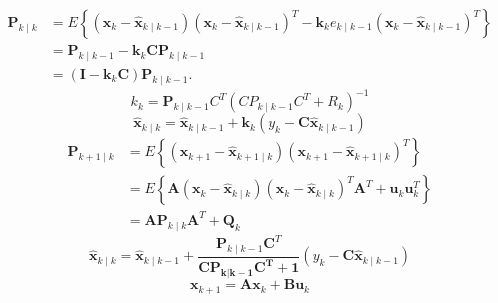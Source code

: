 \begin{equation}\label{eq:kalman_P_kk}
\begin{aligned}
\boldsymbol{P}_{k \mid k} &=E\left\{\left(\boldsymbol{x}_k-\hat{\boldsymbol{x}}_{k \mid k-1}\right)\left(\boldsymbol{x}_k-\hat{\boldsymbol{x}}_{k \mid k-1}\right)^T-\boldsymbol{k}_k e_{k \mid k-1}\left(\boldsymbol{x}_k-\hat{\boldsymbol{x}}_{k \mid k-1}\right)^T\right\} \\
&=\boldsymbol{P}_{k \mid k-1}-\boldsymbol{k}_k \boldsymbol{C} \boldsymbol{P}_{k \mid k-1} \\
&=\left(\boldsymbol{I}-\boldsymbol{k}_k \boldsymbol{C}\right) \boldsymbol{P}_{k \mid k-1} .
\end{aligned}
\end{equation}
\begin{equation}\label{eq:kalman_k_k}
k_k=\boldsymbol{P}_{k \mid k-1} C^T\left(C P_{k \mid k-1} C^T+R_k\right)^{-1}
\end{equation}
\begin{equation}\label{eq:kalman_x_kk}
\hat{\boldsymbol{x}}_{k \mid k}=\hat{\boldsymbol{x}}_{k \mid k-1}+\boldsymbol{k}_k\left(y_k-\boldsymbol{C} \hat{\boldsymbol{x}}_{k \mid k-1}\right)
\end{equation}
\begin{equation}\label{eq:kalman_P_kk+1}
\begin{aligned}
\boldsymbol{P}_{k+1 \mid k} &=E\left\{\left(\boldsymbol{x}_{k+1}-\hat{\boldsymbol{x}}_{k+1 \mid k}\right)\left(\boldsymbol{x}_{k+1}-\hat{\boldsymbol{x}}_{k+1 \mid k}\right)^T\right\} \\
&=E\left\{\boldsymbol{A}\left(\boldsymbol{x}_k-\hat{\boldsymbol{x}}_{k \mid k}\right)\left(\boldsymbol{x}_k-\hat{\boldsymbol{x}}_{k \mid k}\right)^T \boldsymbol{A}^T+\boldsymbol{u}_k \boldsymbol{u}_k^T\right\} \\
&=\boldsymbol{A} \boldsymbol{P}_{k \mid k} \boldsymbol{A}^T+\boldsymbol{Q}_k
\end{aligned}
\end{equation}
\begin{equation}\label{eq:kalman_x_kk_2}
\hat{\boldsymbol{x}}_{k \mid k}=\hat{\boldsymbol{x}}_{k \mid k-1}+\frac{\boldsymbol{P}_{k \mid k-1} \boldsymbol{C}^T}{\boldsymbol{C P _ { k | k - 1 } C ^ { T } + 1}}\left(y_k-\boldsymbol{C} \hat{\boldsymbol{x}}_{k \mid k-1}\right)
\end{equation}
\begin{equation}\label{eq:kalman_x_kk+1}
\boldsymbol{x}_{k+1}=\boldsymbol{A} \boldsymbol{x}_k+\boldsymbol{B} \boldsymbol{u}_k
\end{equation}






